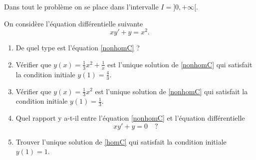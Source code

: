 
\begin{exercice}\label{exoanalyseCTU-0015}


Dans tout le problème on se place dans l'intervalle $I = ]0, +\infty[$. 

On considère l'équation différentielle suivante
\begin{equation}\label{nonhomC}
  xy' + y= x^2.
\end{equation}
\begin{enumerate}
\item De quel type est l'équation \eqref{nonhomC} ?
\item Vérifier que $y(x) = \frac{1}{3} x^2 + \frac{1}{x}$ est l'unique solution de \eqref{nonhomC} qui satisfait la condition initiale $y(1) = \frac{4}{3}$.
\item  Vérifier que $y(x) = \frac{1}{3} x^2$ est l'unique solution de \eqref{nonhomC} qui satisfait la condition initiale $y(1) = \frac{1}{3}$.
\item Quel rapport y a-t-il entre l'équation \eqref{nonhomC} et  l'équation différentielle 
  \begin{equation}\label{homC}
    xy' + y= 0 \quad ?
  \end{equation}
\item Trouver l'unique solution de \eqref{homC} qui satisfait la condition initiale $y(1) = 1$.   
\end{enumerate}


\end{exercice}
